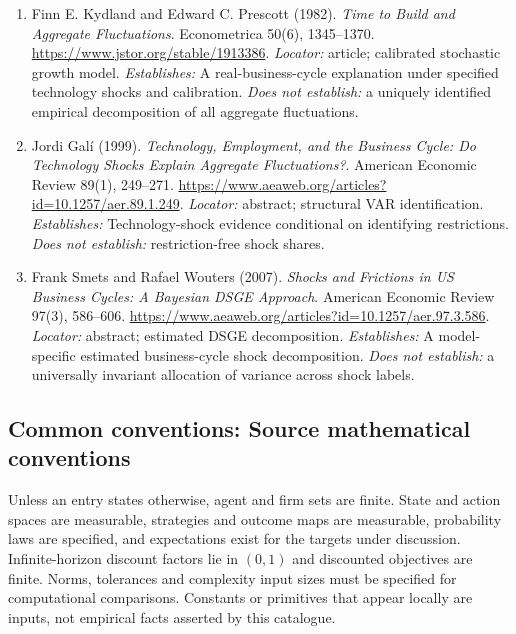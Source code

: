 \documentclass[11pt,a4paper]{article}
\begin{document}
\begin{enumerate}

\item[S1] Finn E. Kydland and Edward C. Prescott (1982). \emph{Time to Build and Aggregate Fluctuations}. Econometrica 50(6), 1345--1370. \url{https://www.jstor.org/stable/1913386}. \textit{Locator:} article; calibrated stochastic growth model. \textit{Establishes:} A real-business-cycle explanation under specified technology shocks and calibration. \textit{Does not establish:} a uniquely identified empirical decomposition of all aggregate fluctuations.

\item[S2] Jordi Galí (1999). \emph{Technology, Employment, and the Business Cycle: Do Technology Shocks Explain Aggregate Fluctuations?}. American Economic Review 89(1), 249--271. \url{https://www.aeaweb.org/articles?id=10.1257/aer.89.1.249}. \textit{Locator:} abstract; structural VAR identification. \textit{Establishes:} Technology-shock evidence conditional on identifying restrictions. \textit{Does not establish:} restriction-free shock shares.

\item[S3] Frank Smets and Rafael Wouters (2007). \emph{Shocks and Frictions in US Business Cycles: A Bayesian DSGE Approach}. American Economic Review 97(3), 586--606. \url{https://www.aeaweb.org/articles?id=10.1257/aer.97.3.586}. \textit{Locator:} abstract; estimated DSGE decomposition. \textit{Establishes:} A model-specific estimated business-cycle shock decomposition. \textit{Does not establish:} a universally invariant allocation of variance across shock labels.

\end{enumerate}

\subsection*{Common conventions: Source mathematical conventions}

Unless an entry states otherwise, agent and firm sets are finite. State and action spaces are measurable, strategies and outcome maps are measurable, probability laws are specified, and expectations exist for the targets under discussion. Infinite-horizon discount factors lie in $(0,1)$ and discounted objectives are finite. Norms, tolerances and complexity input sizes must be specified for computational comparisons. Constants or primitives that appear locally are inputs, not empirical facts asserted by this catalogue.
\end{document}
